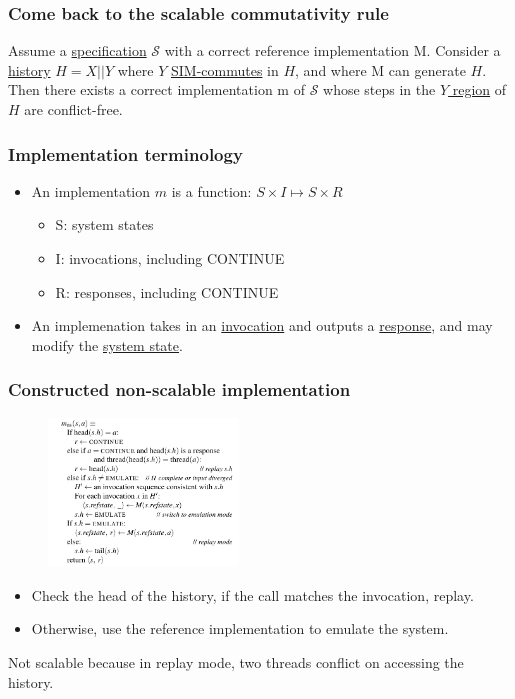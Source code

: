 \documentclass{beamer}
\begin{document}
\begin{frame}
\frametitle{Come back to the scalable commutativity rule}
Assume a \uline{specification} $\mathscr{S}$ with a correct reference 
implementation M. Consider a \uline{history} $H = X || Y$ where $Y$ 
\uline{SIM-commutes} in $H$, 
and where M can generate $H$. Then there exists a correct implementation m of 
$\mathscr{S}$ whose steps in the \uline{$Y$ region} of $H$ are conflict-free.
\end{frame}


\begin{frame}
  \frametitle{Implementation terminology}
  \begin{itemize}
    \item An implementation $m$ is a function: $S \times I \longmapsto S \times R$
      \begin{itemize}
      \item S: system states
      \item I: invocations, including CONTINUE
      \item R: responses, including CONTINUE
      \end{itemize}
    \item An implemenation takes in an \uline{invocation} and outputs a 
      \uline{response}, and may modify the \uline{system state}.
  \end{itemize}
\end{frame}

\begin{frame}
\frametitle{Constructed non-scalable implementation}
\begin{multicols}{2}
\begin{figure}
   \includegraphics[width=0.45\textwidth]{799-s14-docs/nonscalable_imple.png}
 \end{figure}
\columnbreak
\begin{itemize}
\item Check the head of the history, if the call matches the invocation, replay.
\item Otherwise, use the reference implementation to emulate the system.
\end{itemize}
\end{multicols}

Not scalable because in replay mode, two threads conflict on accessing the history.

\end{frame}
\end{document}
